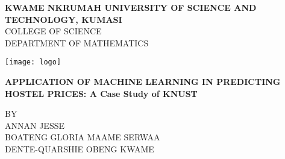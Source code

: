 \begin{titlepage}
	\begin{center}
		\vspace*{1cm}
		
		\LARGE
		\textbf{KWAME NKRUMAH UNIVERSITY OF SCIENCE AND TECHNOLOGY, KUMASI} \\
		COLLEGE OF SCIENCE \\
		DEPARTMENT OF MATHEMATICS
	
		\vspace{0.7in}
		
		\texttt{[image: logo]}
		
		\vspace{0.7in}
		
		\textbf{APPLICATION OF MACHINE LEARNING IN PREDICTING HOSTEL PRICES: A Case Study of KNUST}
		
		\vspace{0.3in}
		
		\large
			BY \\ \vspace{0.3in}
			ANNAN JESSE \\
			BOATENG GLORIA MAAME SERWAA \\
			DENTE-QUARSHIE OBENG KWAME
		
	\end{center}
\end{titlepage}